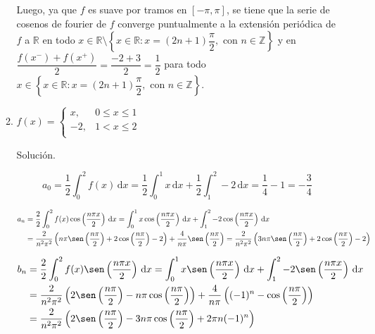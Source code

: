 \documentclass[fleqn]{article}
\newcommand{\real}{\mathbb{R}}
\newcommand{\ent}{\mathbb{Z}}
\newcommand{\intg}[3]{\int_{#1}^{#2} #3 \, \mathrm{d}x}
\begin{document}
\begin{enumerate}[I.]
\begin{enumerate}[(1)]
			Luego, ya que $f$ es suave por tramos en $ [-\pi,\pi] $, se tiene que la serie de cosenos de fourier de $f$ converge puntualmente a la extensión periódica de $f$ a $ \real $ en todo $ x \in \real \setminus \left\lbrace x \in \real \colon x = (2n+1) \dfrac{\pi}{2}, \mbox{ con } n \in \ent \right\rbrace $ y en $ \dfrac{f(x^-) + f(x^+)}{2} = \dfrac{-2+3}{2} = \dfrac{1}{2} $ para todo $ x \in \left\lbrace x \in \real \colon x = (2n+1) \dfrac{\pi}{2}, \mbox{ con } n \in \ent \right\rbrace $.


			\bfseries
			\item $ f(x) = \begin{cases}
				x, & 0 \leq x \leq 1 \\
				-2, & 1 < x \leq 2 \\
			\end{cases} $

			Solución.

			\normalfont

			\begin{equation*}
				a_0 = \dfrac{1}{2} \intg{0}{2}{f(x)} = \dfrac{1}{2} \intg{0}{1}{x} + \dfrac{1}{2} \intg{1}{2}{-2} = \dfrac{1}{4} - 1 = -\dfrac{3}{4}
			\end{equation*}

			\begin{align*}
				a_n &= \dfrac{2}{2} \intg{0}{2}{f(x) \cos \left( \dfrac{n \pi x}{2} \right)} = \intg{0}{1}{x \cos \left( \dfrac{n \pi x}{2} \right)} + \intg{1}{2}{-2 \cos \left( \dfrac{n \pi x}{2} \right)} \\
				&= \dfrac{2}{n^2 \pi^2} \left( n \pi \sen \left( \dfrac{n \pi}{2} \right) + 2 \cos \left( \dfrac{n \pi}{2} \right) - 2 \right) + \dfrac{4}{n \pi} \sen \left( \dfrac{n \pi}{2} \right) = \dfrac{2}{n^2 \pi^2} \left( 3n \pi \sen \left( \dfrac{n \pi}{2} \right) + 2 \cos \left( \dfrac{n \pi}{2} \right) - 2 \right)
			\end{align*}

			\begin{align*}
				b_n &= \dfrac{2}{2} \intg{0}{2}{f(x) \sen \left( \dfrac{n \pi x}{2} \right)} = \intg{0}{1}{x \sen \left( \dfrac{n \pi x}{2} \right)} + \intg{1}{2}{-2 \sen \left( \dfrac{n \pi x}{2} \right)} \\
				&= \dfrac{2}{n^2 \pi^2} \left( 2 \sen \left( \dfrac{n \pi}{2} \right) - n \pi \cos \left( \dfrac{n \pi}{2} \right) \right) + \dfrac{4}{n \pi} \left( (-1)^n - \cos \left( \dfrac{n \pi}{2} \right) \right) \\
				&= \dfrac{2}{n^2 \pi^2} \left( 2 \sen \left( \dfrac{n \pi}{2} \right) - 3n \pi \cos \left( \dfrac{n \pi}{2} \right) + 2 \pi n (-1)^n \right)
			\end{align*}


\end{enumerate}
\end{enumerate}
\end{document}
